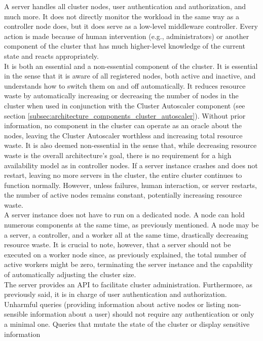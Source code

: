 A server handles all cluster nodes, user authentication and authorization, and
much more. It does not directly monitor the workload in the same way as a controller
node does, but it does serve as a low-level middleware controller. Every action is
made because of human intervention (e.g., administrators) or another component of
the cluster that has much higher-level knowledge of the current state and reacts
appropriately. \\ %
It is both an essential and a non-essential component of the cluster. It is
essential in the sense that it is aware of all registered nodes, both active and
inactive, and understands how to switch them on and off automatically. It reduces
resource waste by automatically increasing or decreasing the number of nodes in the
cluster when used in conjunction with the Cluster Autoscaler component (see
section \ref{subsec:architecture_components_cluster_autoscaler}). Without prior
information, no component in the cluster can operate as an oracle about the nodes,
leaving the Cluster Autoscaler worthless and increasing total resource waste. It
is also deemed non-essential in the sense that, while decreasing resource waste
is the overall architecture's goal, there is no requirement for a high availability
model as in controller nodes. If a server instance crashes and does not restart,
leaving no more servers in the cluster, the entire cluster continues to function
normally. However, unless failures, human interaction, or server restarts, the number
of active nodes remains constant, potentially increasing resource waste. \\ %
A server instance does not have to run on a dedicated node. A node can hold numerous
components at the same time, as previously mentioned. A node may be a server, a
controller, and a worker all at the same time, drastically decreasing resource
waste. It is crucial to note, however, that a server should not be executed on a
worker node since, as previously explained, the total number of active workers might
be zero, terminating the server instance and the capability of automatically
adjusting the cluster size. \\ %
The server provides an API to facilitate cluster administration. Furthermore, as
previously said, it is in charge of user authentication and authorization.
Unharmful queries (providing information about active nodes or listing non-sensible
information about a user) should not require any authentication or only a
minimal one. Queries that mutate the state of the cluster or display sensitive information
